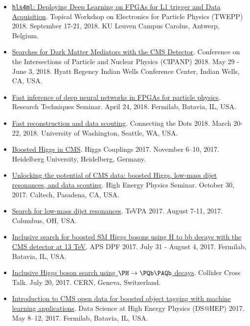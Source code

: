 \documentclass[11pt]{res}
\begin{document}
\begin{resume}
\begin{itemize}
    \item \href{https://indico.cern.ch/event/697988/contributions/3055990/}{\texttt{hls4ml}: Deploying Deep Learning on FPGAs for L1 trigger and Data Acquisition}. Topical Workshop on Electronics for Particle Physics (TWEPP) 2018. September 17-21, 2018. KU Leuven Campus Carolus, Antwerp, Belgium.
    \item \href{https://conferences.lbl.gov/event/137/session/27/contribution/354}{Searches for Dark Matter Mediators with the CMS Detector}. Conference on the Intersections of Particle and Nuclear Physics (CIPANP) 2018. May 29 - June 3, 2018. Hyatt Regency Indian Wells Conference Center, Indian Wells, CA, USA.
    \item \href{https://indico.fnal.gov/event/16908/}{Fast inference of deep neural networks in FPGAs for particle physics}. Research Techniques Seminar. April 24, 2018. Fermilab, Batavia, IL, USA.
    \item \href{https://indico.cern.ch/event/658267/contributions/2881127/}{Fast reconstruction and data scouting}. Connecting the Dots 2018. March 20-22, 2018. University of Washington, Seattle, WA, USA.
    \item \href{http://www.thphys.uni-heidelberg.de/~higgs/talks/duarte.pdf}{Boosted Higgs in CMS}. Higgs Couplings 2017. November 6--10, 2017. Heidelberg University, Heidelberg, Germany.
    \item \href{https://indico.hep.caltech.edu/indico/conferenceDisplay.py?confId=149}{Unlocking the potential of CMS data: boosted Higgs, low-mass dijet resonances, and data scouting}. High Energy Physics Seminar. October 30, 2017. Caltech, Pasadena, CA, USA.
    \item \href{https://indico.cern.ch/event/615891/contributions/2666361/}{Search for low-mass dijet resonances}. TeVPA 2017. August 7-11, 2017. Columbus, OH, USA.
    \item \href{https://indico.fnal.gov/contributionDisplay.py?sessionId=14&contribId=38&confId=11999}{Inclusive search for boosted SM Higgs bosons using H to bb decays with the CMS detector at 13 TeV}. APS DPF 2017. July 31 - August 4, 2017. Fermilab, Batavia, IL, USA.
    \item \href{https://indico.cern.ch/event/649575/}{Inclusive Higgs boson search using $\PH\to\bbbar$ decays}. Collider Cross Talk. July 20, 2017. CERN, Geneva, Switzerland.
    \item \href{https://indico.fnal.gov/contributionDisplay.py?sessionId=6&contribId=54&confId=13497}{Introduction to CMS open data for boosted object tagging with machine learning applications}. Data Science at High Energy Physics (DS@HEP) 2017. May 8--12, 2017. Fermilab, Batavia, IL, USA.

\end{itemize}
\end{resume}
\end{document}
